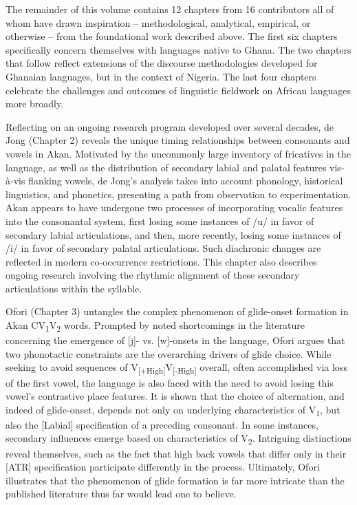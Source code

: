\documentclass[output=paper,colorlinks,citecolor=brown]{langscibook}
\begin{document}
The remainder of this volume contains 12 chapters from 16 contributors all of whom have drawn inspiration -- methodological, analytical, empirical, or otherwise -- from the foundational work described above. The first six chapters specifically concern themselves with languages native to Ghana. The two chapters that follow reflect extensions of the discourse methodologies developed for Ghanaian languages, but in the context of Nigeria. The last four chapters celebrate the challenges and outcomes of linguistic fieldwork on African languages more broadly. 

Reflecting on an ongoing research program developed over several decades, de Jong (Chapter 2) reveals the unique timing relationships between consonants and vowels in Akan. Motivated by the uncommonly large inventory of fricatives in the language, as well as the distribution of secondary labial and palatal features vis-à-vis flanking vowels, de Jong's analysis takes into account phonology, historical linguistics, and phonetics, presenting a path from observation to experimentation. Akan appears to have undergone two processes of incorporating vocalic features into the consonantal system, first losing some instances of /u/ in favor of secondary labial articulations, and then, more recently, losing some instances of /i/ in favor of secondary palatal articulations. Such diachronic changes are reflected in modern co-occurrence restrictions. This chapter also describes ongoing research involving the rhythmic alignment of these secondary articulations within the syllable.

\begin{sloppypar}
Ofori (Chapter 3) untangles the complex phenomenon of glide-onset formation in Akan CV\textsubscript{1}V\textsubscript{2} words. Prompted by noted shortcomings in the literature concerning the emergence of [j]- vs. [w]-onsets in the language, Ofori argues that two phonotactic constraints are the overarching drivers of glide choice. While seeking to avoid sequences of V\textsubscript{[+High]}V\textsubscript{[-High]} overall, often accomplished via loss of the first vowel, the language is also faced with the need to avoid losing this vowel's contrastive place features. It is shown that the choice of alternation, and indeed of glide-onset, depends not only on underlying characteristics of V\textsubscript{1}, but also the [Labial] specification of a preceding consonant. In some instances, secondary influences emerge based on characteristics of V\textsubscript{2}. Intriguing distinctions reveal themselves, such as the fact that high back vowels that differ only in their [ATR] specification participate differently in the process. Ultimately, Ofori illustrates that the phenomenon of glide formation is far more intricate than the published literature thus far would lead one to believe.
\end{sloppypar}
\end{document}
